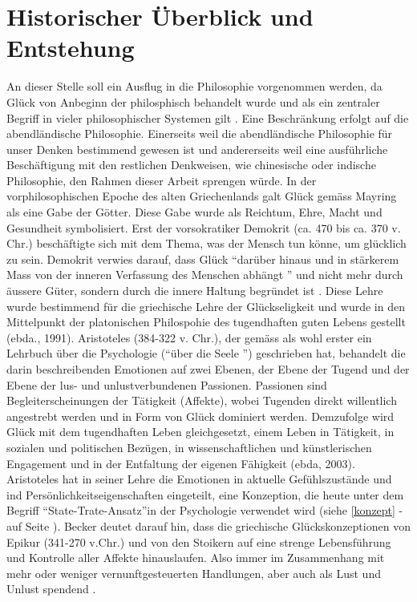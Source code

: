 \section{Historischer Überblick und Entstehung}\label{überblick}
An dieser Stelle soll ein Ausflug in die Philosophie vorgenommen werden, da Glück von Anbeginn der philosphisch behandelt wurde und als ein zentraler Begriff in vieler philosophischer Systemen gilt \cite{Mayring:1991}. Eine Beschränkung erfolgt auf die abendländische Philosophie. Einerseits weil die abendländische Philosophie für unser Denken bestimmend gewesen ist und andererseits weil eine ausführliche Beschäftigung mit den restlichen Denkweisen, wie chinesische oder indische Philosophie, den Rahmen dieser Arbeit sprengen würde. \newline
In der vorphilosophischen Epoche des alten Griechenlands galt Glück gemäss Mayring \cite{Mayring:1991} als eine Gabe der Götter. Diese Gabe wurde als Reichtum, Ehre, Macht und Gesundheit symbolisiert. Erst der vorsokratiker Demokrit (ca. 470 bis ca. 370 v. Chr.) beschäftigte sich mit dem Thema, was der Mensch tun könne, um glücklich zu sein. Demokrit verwies darauf, dass Glück \textquotedblleft darüber hinaus und in stärkerem Mass von der inneren Verfassung des Menschen abhängt \textquotedblright \cite{Becker:1994} und nicht mehr durch äussere Güter, sondern durch die innere Haltung begründet ist \cite{Mayring:1991}. Diese Lehre wurde bestimmend für die griechische Lehre der Glückseligkeit und wurde in den Mittelpunkt der platonischen Philospohie des tugendhaften guten Lebens gestellt (ebda., 1991).\newline
Aristoteles (384-322 v. Chr.), der gemäss \cite{Mayring:2003} als wohl erster ein Lehrbuch über die Psychologie (\textquotedblleft über die Seele \textquotedblright) geschrieben hat, behandelt die darin beschreibenden Emotionen auf zwei Ebenen, der Ebene der Tugend und der Ebene der lus- und unlustverbundenen Passionen. Passionen sind Begleiterscheinungen der Tätigkeit (Affekte), wobei Tugenden direkt willentlich angestrebt werden und in Form von Glück dominiert werden. Demzufolge wird Glück mit dem tugendhaften Leben gleichgesetzt, einem Leben in Tätigkeit, in sozialen und politischen Bezügen, in wissenschaftlichen und künstlerischen Engagement und in der Entfaltung der eigenen Fähigkeit (ebda, 2003). Aristoteles hat in seiner Lehre die Emotionen in aktuelle Gefühlszustände und ind Persönlichkeitseigenschaften eingeteilt, eine Konzeption, die heute unter dem Begriff \textquotedblleft State-Trate-Ansatz\textquotedblright in der Psychologie verwendet wird (siehe \ref{konzept} -  auf Seite \pageref{konzept}). Becker \cite{Becker:1994} deutet darauf hin, dass die griechische Glückskonzeptionen von Epikur (341-270 v.Chr.) und von den Stoikern auf eine strenge Lebensführung und Kontrolle aller Affekte hinauslaufen. Also immer im Zusammenhang mit mehr oder weniger vernunftgesteuerten Handlungen, aber auch als Lust und Unlust spendend \cite{Mayring:2003}.\newline
